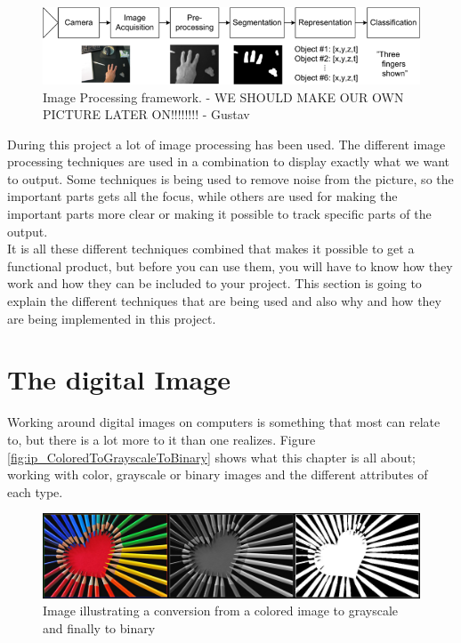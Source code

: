 \begin{figure}[htbp]
\centering
\includegraphics[width=1.00\textwidth]{Pictures/Theory/imageProcessing_steps.png}
\caption{Image Processing framework. - WE SHOULD MAKE OUR OWN PICTURE LATER ON!!!!!!!! - Gustav}
\label{fig:ip_framework}
\end{figure}

During this project a lot of image processing has been used. The different image processing techniques are used in a combination to display exactly what we want to output. Some techniques is being used to remove noise from the picture, so the important parts gets all the focus, while others are used for making the important parts more clear or making it possible to track specific parts of the output. \\
It is all these different techniques combined that makes it possible to get a functional product, but before you can use them, you will have to know how they work and how they can be included to your project. This section is going to explain the different techniques that are being used and also why and how they are being implemented in this project.

\section{The digital Image}
Working around digital images on computers is something that most can relate to, but there is a lot more to it than one realizes. Figure \eqref{fig:ip_ColoredToGrayscaleToBinary} shows what this chapter is all about; working with color, grayscale or binary images and the different attributes of each type.

\begin{figure}[htbp]
\centering
\includegraphics[width=1.00\textwidth]{Pictures/Theory/ColoredToGrayscaleToBinary.jpg}
\caption{Image illustrating a conversion from a colored image to grayscale and finally to binary}
\label{fig:ip_ColoredToGrayscaleToBinary}
\end{figure}

